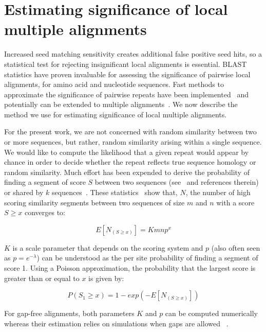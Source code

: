 \documentclass[12pt,journal,draftcls,letterpaper,onecolumn]{IEEEtran}
\begin{document}
\section{Estimating significance of local multiple alignments}
Increased seed matching sensitivity creates additional
false positive seed hits, so a statistical test for rejecting
insignificant local alignments is essential.  BLAST statistics have proven
invaluable for assessing the significance of pairwise local alignments, for amino acid and nucleotide sequences.
Fast methods to approximate the significance of pairwise
repeats have been implemented~\cite{repseek} and potentially can be
extended to multiple alignments~\cite{ref-related1, Prakash2005}.  We
now describe the method we use for estimating significance of local
multiple alignments.

For the present work, we are not concerned with random similarity between two or more sequences, but rather, random similarity arising within a single sequence.  We would like to compute the likelihood that a given repeat would appear by chance in order to decide whether the repeat reflects true sequence homology or random similarity.  Much effort has been expended to derive the probability of finding a segment of score $S$ between two sequences (see~\cite{Ewens2001} and references therein) or shared by $k$ sequences~\cite{ref-related1}. These statistics~\cite{Karlin1990} show that, $N$, the number of high scoring similarity segments between two sequences of size $m$ and $n$ with a score $S \geq x$ converges to:

\begin{equation}
    E[ N_{(S\geq x)} ] = Kmn p^x
    \label{E_mn}
\end{equation}

$K$ is a scale parameter that depends on the scoring system and $p$ (also often seen as $p=e^{-\lambda}$) can be understood as the per site probability of finding a segment of score 1. Using a Poisson approximation, the probability that the largest score is greater than or equal to $x$ is given by:

\begin{equation}
    P( S_1 \geq x) = 1 - exp( -E[ N_{(S\geq x)} ] )
    \label{P_s1}
\end{equation}

For gap-free alignments, both parameters $K$ and $p$ can be computed numerically~\cite{Karlin1990} whereas their estimation relies on simulations when gaps are allowed  ~\cite{Waterman1994, Altschul2001}.
\end{document}
